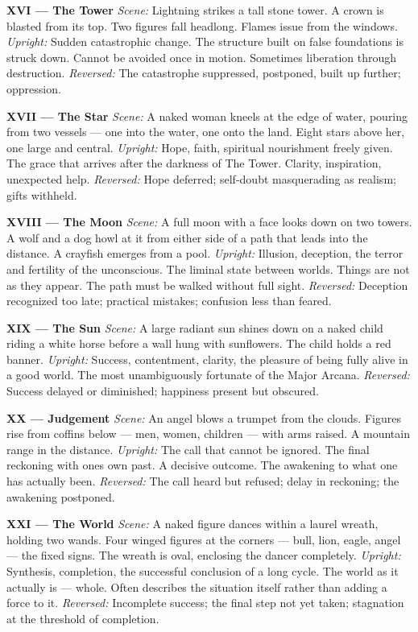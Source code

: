 \textbf{XVI --- The Tower} \emph{Scene:} Lightning strikes a tall stone tower. A crown is blasted from its top. Two figures fall headlong. Flames issue from the windows. \emph{Upright:} Sudden catastrophic change. The structure built on false foundations is struck down. Cannot be avoided once in motion. Sometimes liberation through destruction. \emph{Reversed:} The catastrophe suppressed, postponed, built up further; oppression.

\textbf{XVII --- The Star} \emph{Scene:} A naked woman kneels at the edge of water, pouring from two vessels --- one into the water, one onto the land. Eight stars above her, one large and central. \emph{Upright:} Hope, faith, spiritual nourishment freely given. The grace that arrives after the darkness of The Tower. Clarity, inspiration, unexpected help. \emph{Reversed:} Hope deferred; self-doubt masquerading as realism; gifts withheld.

\textbf{XVIII --- The Moon} \emph{Scene:} A full moon with a face looks down on two towers. A wolf and a dog howl at it from either side of a path that leads into the distance. A crayfish emerges from a pool. \emph{Upright:} Illusion, deception, the terror and fertility of the unconscious. The liminal state between worlds. Things are not as they appear. The path must be walked without full sight. \emph{Reversed:} Deception recognized too late; practical mistakes; confusion less than feared.

\textbf{XIX --- The Sun} \emph{Scene:} A large radiant sun shines down on a naked child riding a white horse before a wall hung with sunflowers. The child holds a red banner. \emph{Upright:} Success, contentment, clarity, the pleasure of being fully alive in a good world. The most unambiguously fortunate of the Major Arcana. \emph{Reversed:} Success delayed or diminished; happiness present but obscured.

\textbf{XX --- Judgement} \emph{Scene:} An angel blows a trumpet from the clouds. Figures rise from coffins below --- men, women, children --- with arms raised. A mountain range in the distance. \emph{Upright:} The call that cannot be ignored. The final reckoning with one\textquotesingle s own past. A decisive outcome. The awakening to what one has actually been. \emph{Reversed:} The call heard but refused; delay in reckoning; the awakening postponed.

\textbf{XXI --- The World} \emph{Scene:} A naked figure dances within a laurel wreath, holding two wands. Four winged figures at the corners --- bull, lion, eagle, angel --- the fixed signs. The wreath is oval, enclosing the dancer completely. \emph{Upright:} Synthesis, completion, the successful conclusion of a long cycle. The world as it actually is --- whole. Often describes the situation itself rather than adding a force to it. \emph{Reversed:} Incomplete success; the final step not yet taken; stagnation at the threshold of completion.

